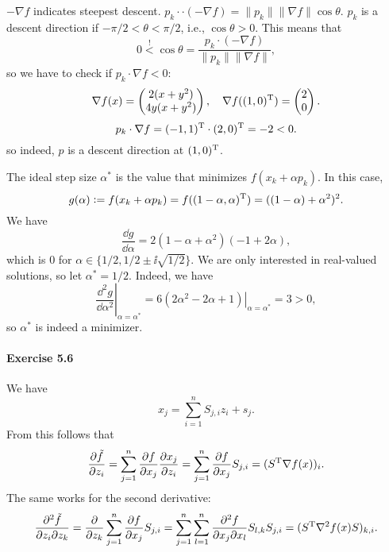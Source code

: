 $−\nabla f$ indicates steepest descent. $p_k\cdot · (−\nabla f) = \|p_k\| \|\nabla f\| \cos\theta$. $p_k$ is a descent direction if $−\pi/2 < \theta < \pi /2$, i.e., $\cos \theta > 0$. This means that
\[
0 \stackrel{!}{<} \cos\theta = \frac{p_k\cdot (-\nabla f)}{\|p_k\|\|\nabla f\|},
\]
so we have to check if $p_k\cdot\nabla f < 0$:
\[
\nabla f(x) =
\begin{pmatrix}
2(x+y^2)\\
4y(x+y^2)
\end{pmatrix},
\quad
\nabla f((1,0)^{\text{\upshape T}}) =
\begin{pmatrix}
2\\
0
\end{pmatrix}.
\]
\[
p_k \cdot \nabla f
=
(-1, 1)^{\text{\upshape T}} \cdot (2,0)^{\text{\upshape T}} = -2 < 0.
\]
so indeed, $p$ is a descent direction at $(1,0)^{\text{\upshape T}}$.

The ideal step size $\alpha^*$ is the value that minimizes $f(x_k+\alpha
p_k)$. In this case,
\[
g(\alpha) \mathrel{\mathop:}= f(x_k + \alpha p_k) = f((1-\alpha,\alpha)^{\text{\upshape T}}) = ((1-\alpha)+\alpha^2)^2.
\]
We have
\[
\frac{\dd g}{\dd\alpha} = 2(1-\alpha+\alpha^2)(-1+2\alpha),
\]
which is $0$ for $\alpha\in\{1/2, 1/2\pm\ii\sqrt{1/2}\}$. We are only
interested in real-valued solutions, so let $\alpha^*=1/2$. Indeed, we have
\[
\left.\frac{\dd^2 g}{\dd\alpha^2}\right|_{\alpha=\alpha^*}
= \left.6(2\alpha^2-2\alpha+1)\right|_{\alpha=\alpha^*}
= 3 > 0,
\]
so $\alpha^*$ is indeed a minimizer.

\paragraph{Exercise 5.6} %

We have
\[
x_j = \sum_{i=1}^n S_{j,i}z_i  + s_j.
\]
From this follows that
\[
\frac{\partial \tilde{f}}{\partial z_i}
= \sum_{j=1}^n \frac{\partial f}{\partial x_j} \frac{\partial x_j}{\partial z_i}
= \sum_{j=1}^n \frac{\partial f}{\partial x_j} S_{j,i}
= (S^{\text{\upshape T}}\nabla f(x))_i.
\]
The same works for the second derivative:
\[
\frac{\partial^2 \tilde{f}}{\partial z_i\partial z_k}
= \frac{\partial}{\partial z_k}\sum_{j=1}^n \frac{\partial f}{\partial x_j} S_{j,i}
= \sum_{j=1}^n\sum_{l=1}^n \frac{\partial^2 f}{\partial x_j \partial x_l} S_{l,k} S_{j,i}
= (S^{\text{\upshape T}} \nabla^2 f(x)S)_{k,i}.
\]



